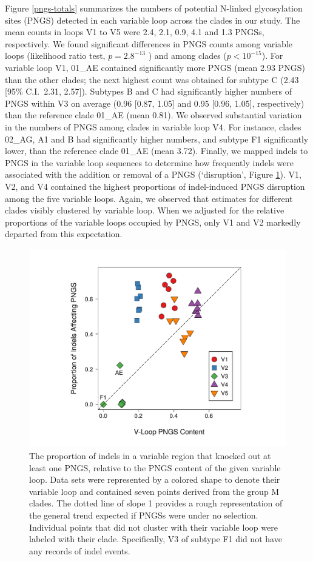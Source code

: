 \documentclass[12pt]{article}
\newcommand{\todo}[2]{\hl{\textbf{#1:} #2}}
\begin{document}
Figure \ref{pngs-totals} summarizes the numbers of potential N-linked glycosylation sites (PNGS) detected in each variable loop across the clades in our study.
The mean counts in loops V1 to V5 were 2.4, 2.1, 0.9, 4.1 and 1.3 PNGSs, respectively.
We found significant differences in PNGS counts among variable loops (likelihood ratio test, $p=2.8^{-13}$ ) and among clades ($p <10^{-15}$).
For variable loop V1, 01\_AE contained significantly more PNGS (mean 2.93 PNGS) than the other clades; the next highest count was obtained for subtype C (2.43 [95\% C.I.~2.31, 2.57]).
Subtypes B and C had significantly higher numbers of PNGS within V3 on average (0.96 [0.87, 1.05] and 0.95 [0.96, 1.05], respectively) than the reference clade 01\_AE (mean 0.81).
We observed substantial variation in the numbers of PNGS among clades in variable loop V4.
For instance, clades 02\_AG, A1 and B had significantly higher numbers, and subtype F1 significantly lower, than the reference clade 01\_AE (mean 3.72).
Finally, we mapped indels to PNGS in the variable loop sequences to determine how frequently indels were associated with the addition or removal of a PNGS (`disruption', Figure \ref{indel-disrupt}). 
V1, V2, and V4 contained the highest proportions of indel-induced PNGS disruption among the five variable loops.
Again, we observed that estimates for different clades visibly clustered by variable loop.
When we adjusted for the relative proportions of the variable loops occupied by PNGS, only V1 and V2 markedly departed from this expectation.


\begin{figure}
    \centering
	\includegraphics[width=.7\textwidth,trim={35mm 10mm 15mm 10mm}, clip]{indel-disrupt}
    \caption{
    The proportion of indels in a variable region that knocked out at least one PNGS, relative to the PNGS content of the given variable loop. 
    Data sets were represented by a colored shape to denote their variable loop and contained seven points derived from the group M clades.
    The dotted line of slope 1 provides a rough representation of the general trend expected if PNGSs were under no selection.    
    Individual points that did not cluster with their variable loop were labeled with their clade. 
    Specifically, V3 of subtype F1 did not have any records of indel events. 
    }
    \label{indel-disrupt}
\end{figure}
\end{document}
